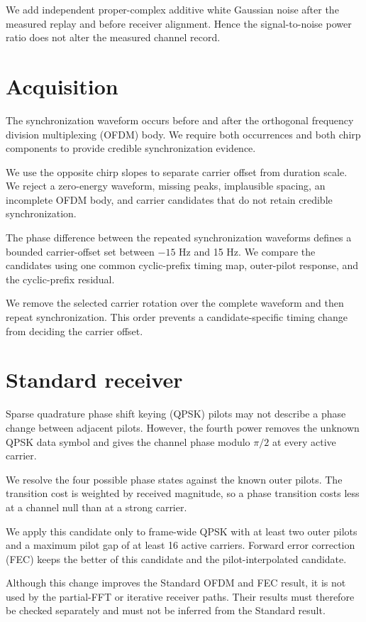 \documentclass[11pt]{article}
\begin{document}
We add independent proper-complex additive white Gaussian noise after the
measured replay and before receiver alignment.  Hence the signal-to-noise
power ratio does not alter the measured channel record.

\section{Acquisition}

The synchronization waveform occurs before and after the orthogonal frequency
division multiplexing (OFDM) body.  We require both occurrences and both chirp
components to provide credible synchronization evidence.

We use the opposite chirp slopes to separate carrier offset from duration
scale.  We reject a zero-energy waveform, missing peaks, implausible spacing,
an incomplete OFDM body, and carrier candidates that do not retain credible
synchronization.

The phase difference between the repeated synchronization waveforms defines a
bounded carrier-offset set between $-15$ Hz and 15 Hz.  We compare the
candidates using one common cyclic-prefix timing map, outer-pilot response, and
the cyclic-prefix residual.

We remove the selected carrier rotation over the complete waveform and then
repeat synchronization.  This order prevents a candidate-specific timing
change from deciding the carrier offset.

\section{Standard receiver}

Sparse quadrature phase shift keying (QPSK) pilots may not describe a phase
change between adjacent pilots.  However, the fourth power removes the unknown
QPSK data symbol and gives the channel phase modulo $\pi/2$ at every active
carrier.

We resolve the four possible phase states against the known outer pilots.  The
transition cost is weighted by received magnitude, so a phase transition costs
less at a channel null than at a strong carrier.

We apply this candidate only to frame-wide QPSK with at least two outer pilots
and a maximum pilot gap of at least 16 active carriers.  Forward error
correction (FEC) keeps the better of this candidate and the pilot-interpolated
candidate.

Although this change improves the Standard OFDM and FEC result, it is not used
by the partial-FFT or iterative receiver paths.  Their results must therefore
be checked separately and must not be inferred from the Standard result.
\end{document}
